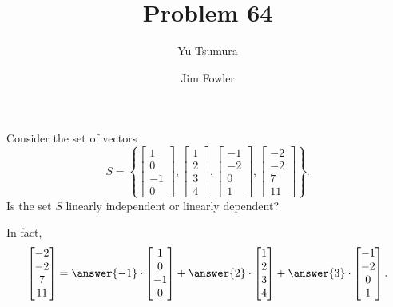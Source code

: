 \documentclass{ximera}
\title{Problem 64}
\author{Yu Tsumura \and Jim Fowler}
\begin{document}
\begin{problem}
	
  Consider the set of vectors
  \[S = \left\{ \begin{bmatrix}
        1 \\
        0 \\
        -1 \\
        0 
      \end{bmatrix}, \begin{bmatrix}
        1 \\
        2 \\
        3 \\
        4 
      \end{bmatrix}, \begin{bmatrix}
        -1 \\
        -2 \\
        0 \\
        1 
      \end{bmatrix}, 
      \begin{bmatrix}
        -2 \\
        -2 \\
        7 \\
        11 
      \end{bmatrix} \right\}.\]
  Is the set $S$ linearly independent or linearly dependent?
  \begin{multipleChoice}
  \end{multipleChoice}

  \begin{problem}
    In fact,
    \[
      \begin{bmatrix}
        -2 \\
        -2 \\
        7 \\
        11 
      \end{bmatrix} =
      \answer{-1} \cdot \begin{bmatrix}
        1 \\
        0 \\
        -1 \\
        0 
      \end{bmatrix} +
      \answer{2} \cdot \begin{bmatrix}
        1 \\
        2 \\
        3 \\
        4 
      \end{bmatrix} +
      \answer{3} \cdot \begin{bmatrix}
        -1 \\
        -2 \\
        0 \\
        1 
      \end{bmatrix}.
    \]
  \end{problem}

\end{problem}
\end{document}
